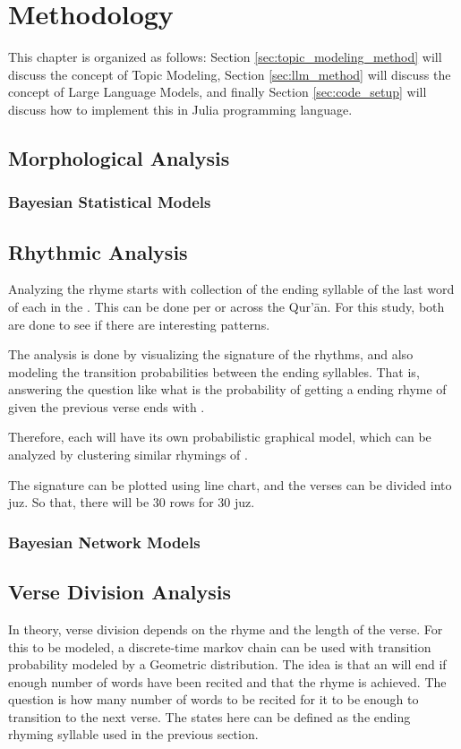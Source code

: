 
\chapter{Methodology}
This chapter is organized as follows: Section \ref{sec:topic_modeling_method} will discuss the concept of Topic Modeling, Section \ref{sec:llm_method} will discuss the concept of Large Language Models, and finally Section \ref{sec:code_setup} will discuss how to implement this in Julia programming language.
\section{Morphological Analysis}
\subsection{Bayesian Statistical Models}

\section{Rhythmic Analysis}
Analyzing the rhyme starts with collection of the ending syllable of the last word of each   in the  . This can be done per   or across the Qur'\=an. For this study, both are done to see if there are interesting patterns. 

The analysis is done by visualizing the signature of the rhythms, and also modeling the transition probabilities between the ending syllables. That is, answering the question like what is the probability of getting a ending rhyme of   given the previous verse ends with  .

Therefore, each   will have its own probabilistic graphical model, which can be analyzed by clustering similar rhymings of  .

The signature can be plotted using line chart, and the verses can be divided into juz. So that, there will be 30 rows for 30 juz.
\subsection{Bayesian Network Models}
\section{Verse Division Analysis}
In theory, verse division depends on the rhyme and the length of the verse. For this to be modeled, a discrete-time markov chain can be used with transition probability modeled by a Geometric distribution. The idea is that an   will end if enough number of words have been recited and that the rhyme is achieved. The question is how many number of words to be recited for it to be enough to transition to the next verse. The states here can be defined as the ending rhyming syllable used in the previous section. 

